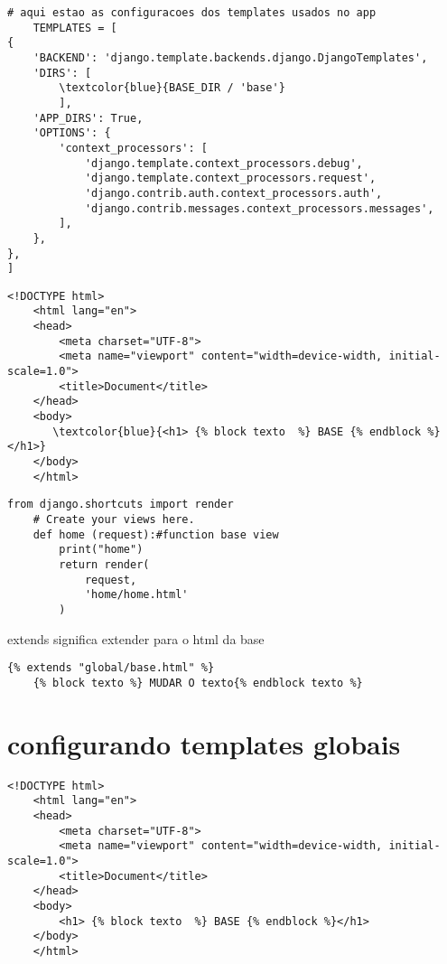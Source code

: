 \documentclass{article}
\begin{document}
\begin{lstlisting}[style=pythonStyle, caption={project/settings.py}]
    # aqui estao as configuracoes dos templates usados no app
    TEMPLATES = [
{
    'BACKEND': 'django.template.backends.django.DjangoTemplates',
    'DIRS': [
        \textcolor{blue}{BASE_DIR / 'base'}
        ],
    'APP_DIRS': True,
    'OPTIONS': {
        'context_processors': [
            'django.template.context_processors.debug',
            'django.template.context_processors.request',
            'django.contrib.auth.context_processors.auth',
            'django.contrib.messages.context_processors.messages',
        ],
    },
},
]
\end{lstlisting}



\begin{lstlisting}[style=htmlStyle, caption={base/global/base.html}]
    <!DOCTYPE html>
    <html lang="en">
    <head>
        <meta charset="UTF-8">
        <meta name="viewport" content="width=device-width, initial-scale=1.0">
        <title>Document</title>
    </head>
    <body>
       \textcolor{blue}{<h1> {% block texto  %} BASE {% endblock %}</h1>} 
    </body>
    </html>
\end{lstlisting}

\begin{lstlisting}[style=htmlStyle, caption={home/views.py}]
    from django.shortcuts import render
    # Create your views here.
    def home (request):#function base view
        print("home")
        return render(
            request,
            'home/home.html'
        )

\end{lstlisting}
extends significa extender para o html da base

\begin{lstlisting}[style=htmlStyle, caption={home/templates/home.html}]
    {% extends "global/base.html" %}
    {% block texto %} MUDAR O texto{% endblock texto %}

\end{lstlisting}

\section{configurando templates globais}

\begin{lstlisting}[style=htmlStyle, caption={base/global/base.html}]
    <!DOCTYPE html>
    <html lang="en">
    <head>
        <meta charset="UTF-8">
        <meta name="viewport" content="width=device-width, initial-scale=1.0">
        <title>Document</title>
    </head>
    <body>
        <h1> {% block texto  %} BASE {% endblock %}</h1>
    </body>
    </html>
\end{lstlisting}
\end{document}
